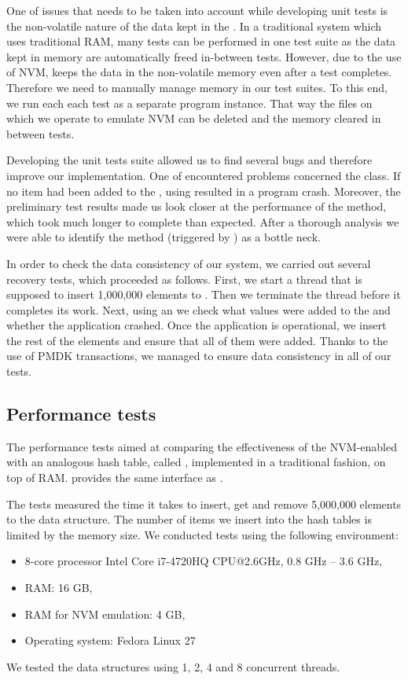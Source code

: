     One of issues that needs to be taken into account while developing unit tests is the non-volatile nature of the data kept in the \NvmHashMap. In a traditional system which uses traditional RAM, many tests can be performed in one test suite as the data kept in memory are automatically freed in-between tests. However, due to the use of NVM, \PHT keeps the data in the non-volatile memory even after a test completes. Therefore we need to manually manage memory in our test suites. To this end, we run each each test as a separate program instance. That way the files on which we operate to emulate NVM can be deleted and the memory cleared in between tests.  

    Developing the unit tests suite allowed us to find several bugs and therefore improve our implementation. One of encountered problems concerned the \Iterator class. If no item had been added to the \PHT, using \Iterator resulted in a program crash. Moreover, the preliminary test results made us look closer at the performance of the \insertMethod method, which took much longer to complete than expected. After a thorough analysis we were able to identify the \expandMethod method (triggered by \insertMethod) as a bottle neck.

    In order to check the data consistency of our system, we carried out several recovery tests, which proceeded as follows. First, we start a thread that is supposed to insert 1,000,000 elements to \PHT. Then we terminate the thread before it completes its work. Next, using an \Iterator we check what values were added to the \PHT and whether the application crashed. Once the application is operational, we insert the rest of the elements and ensure that all of them were added. Thanks to the use of PMDK transactions, we managed to ensure data consistency in all of our tests.
    
\subsection{Performance tests}


    The performance tests aimed at comparing the effectiveness of the NVM-enabled \PHT with an analogous hash table, called \StandardHashMap, implemented in a traditional fashion, on top of RAM. \StandardHashMap provides the same interface as \NvmHashMap.
    
    The tests measured the time it takes to insert, get and remove 5,000,000 elements to the data structure. The number of items we insert into the hash tables is limited by the memory size. We conducted tests using the following environment:
    \begin{itemize}
        \item 8-core processor Intel Core i7-4720HQ CPU@2.6GHz, 0.8 GHz -- 3.6 GHz,
        \item RAM: 16 GB,
        \item RAM for NVM emulation: 4 GB,
        \item Operating system: Fedora Linux 27
    \end{itemize}
    We tested the data structures using 1, 2, 4 and 8 concurrent threads. 
    
